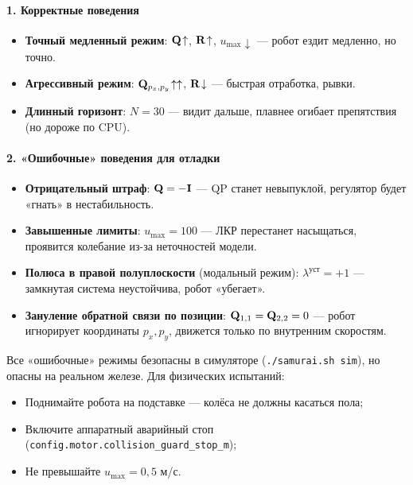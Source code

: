 \paragraph{1. Корректные поведения}
\begin{itemize}
  \item \textbf{Точный медленный режим}: $\mathbf{Q}\!\uparrow$,
        $\mathbf{R}\!\uparrow$, $u_{\max}\!\downarrow$ ---
        робот ездит медленно, но точно.
  \item \textbf{Агрессивный режим}: $\mathbf{Q}_{p_x,p_y}\!\uparrow\uparrow$,
        $\mathbf{R}\!\downarrow$ --- быстрая отработка, рывки.
  \item \textbf{Длинный горизонт}: $N = 30$ --- видит дальше, плавнее
        огибает препятствия (но дороже по CPU).
\end{itemize}

\paragraph{2. «Ошибочные» поведения для отладки}
\begin{itemize}
  \item \textbf{Отрицательный штраф}: $\mathbf{Q} = -\mathbf{I}$ ---
        QP станет невыпуклой, регулятор будет «гнать» в нестабильность.
  \item \textbf{Завышенные лимиты}: $u_{\max} = 100$ --- ЛКР перестанет
        насыщаться, проявится колебание из-за неточностей модели.
  \item \textbf{Полюса в правой полуплоскости} (модальный режим):
        $\lambda^{\text{уст}} = +1$ --- замкнутая система неустойчива,
        робот «убегает».
  \item \textbf{Зануление обратной связи по позиции}: $\mathbf{Q}_{1,1}=\mathbf{Q}_{2,2}=0$ ---
        робот игнорирует координаты $p_x, p_y$, движется только по
        внутренним скоростям.
\end{itemize}

\begin{warnbox}
Все «ошибочные» режимы безопасны в симуляторе (\texttt{./samurai.sh sim}),
но опасны на реальном железе. Для физических испытаний:
\begin{itemize}
  \item Поднимайте робота на подставке --- колёса не должны касаться пола;
  \item Включите аппаратный аварийный стоп
        (\texttt{config.motor.collision\_guard\_stop\_m});
  \item Не превышайте $u_{\max} = 0{,}5$ м/с.
\end{itemize}
\end{warnbox}
